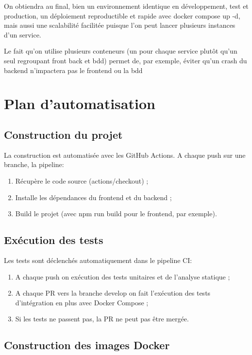 \documentclass{article}
\begin{document}
On obtiendra au final, bien un environnement identique en développement, test et production, un déploiement reproductible et rapide avec docker compose up -d, mais aussi une scalabilité facilitée  puisque l'on peut lancer plusieurs instances d'un service. 

Le fait qu'on utilise plusieurs conteneurs (un pour chaque service plutôt qu'un seul regroupant front back et bdd) permet de, par exemple, éviter qu'un crash du backend n'impactera pas le frontend ou la bdd

\section{Plan d'automatisation}

\subsection{Construction du projet}

La construction est automatisée avec les GitHub Actions. A chaque push sur une branche, la pipeline:

\begin{enumerate}
    \item Récupère le code source (actions/checkout) ;
    \item Installe les dépendances du frontend et du backend ;
    \item Build le projet (avec npm run build pour le frontend, par exemple).
\end{enumerate}

\subsection{Exécution des tests}

Les tests sont déclenchés automatiquement dans le pipeline CI:

\begin{enumerate}
    \item A chaque push on exécution des tests unitaires et de l'analyse statique ;
    \item A chaque PR vers la branche develop on fait l'exécution des tests d'intégration en plus avec Docker Compose ;
    \item Si les tests ne passent pas, la PR ne peut pas être mergée.
\end{enumerate}

\subsection{Construction des images Docker}
\end{document}
